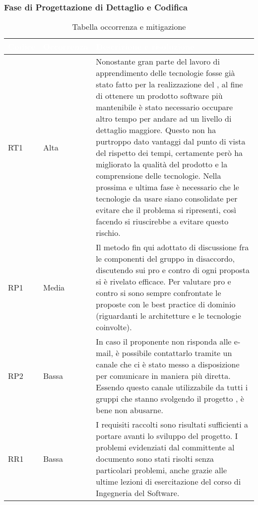 \subsubsection{Fase di Progettazione di Dettaglio e Codifica}
{
\renewcommand{\arraystretch}{2}
\centering
\begin{longtable}{C{2cm} C{3cm} C{10cm}}
\caption{Tabella occorrenza e mitigazione}\\

\textcolor{white}{\textbf{Codice}} & 
\textcolor{white}{\textbf{Occorrenza}} & 
\textcolor{white}{\textbf{Descrizione e risoluzione}}\\	
\endhead

RT1 &
Alta &
Nonostante gran parte del lavoro di apprendimento delle tecnologie fosse già stato fatto per la realizzazione del , al fine di ottenere un prodotto software più mantenibile è stato necessario occupare altro tempo per andare ad un livello di dettaglio maggiore. Questo non ha purtroppo dato vantaggi dal punto di vista del rispetto dei tempi, certamente però ha migliorato la qualità del prodotto e la comprensione delle tecnologie. Nella prossima e ultima fase è necessario che le tecnologie da usare siano consolidate per evitare che il problema si ripresenti, così facendo si riuscirebbe a evitare questo rischio. \\

RP1 &
Media &
Il metodo fin qui adottato di discussione fra le componenti del gruppo in disaccordo, discutendo sui pro e contro di ogni proposta si è rivelato efficace. Per valutare pro e contro si sono sempre confrontate le proposte con le best practice di dominio (riguardanti le architetture e le tecnologie coinvolte). \\

RP2 &
Bassa &
In caso il proponente non risponda alle e-mail, è possibile contattarlo tramite un canale  che ci è stato messo a disposizione per comunicare in maniera più diretta. Essendo questo canale utilizzabile da tutti i gruppi che stanno svolgendo il progetto \NomeProgetto{}, è bene non abusarne. \\

RR1 &
Bassa &
I requisiti raccolti sono risultati sufficienti a portare avanti lo sviluppo del progetto. I problemi evidenziati dal committente al documento \AdR{} sono stati risolti senza particolari problemi, anche grazie alle ultime lezioni di esercitazione del corso di Ingegneria del Software. \\


\end{longtable}}
